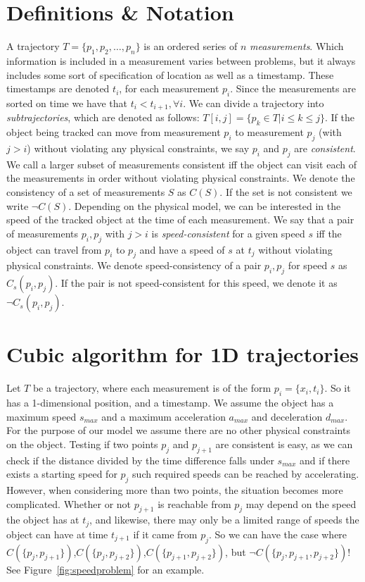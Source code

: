 \documentclass{article}
\begin{document}
\section{Definitions \& Notation}
A trajectory \(T=\{p_1,p_2,\dots,p_n\}\) is an ordered series of \(n\) \emph{measurements}. Which information is included in a measurement varies between problems, but it always includes some sort of specification of location as well as a timestamp. These timestamps are denoted \(t_i\), for each measurement \(p_i\). Since the measurements are sorted on time we have that \(t_i < t_{i+1},  \forall i\). We can divide a trajectory into \emph{subtrajectories}, which are denoted as follows: \(T[i,j]=\{p_k \in T | i \leq k \leq j\}\).
If the object being tracked can move from measurement \(p_i\) to measurement \(p_j\) (with \(j>i\)) without violating any physical constraints, we say \(p_i\) and \(p_j\) are \emph{consistent}. We call a larger subset of measurements consistent iff the object can visit each of the measurements in order without violating physical constraints. 
We denote the consistency of a set of measurements \(S\) as \(C(S)\). If the set is not consistent we write \(\neg C(S)\).
Depending on the physical model, we can be interested in the speed of the tracked object at the time of each measurement. We say that a pair of measurements \(p_i, p_j\) with \(j>i\) is \emph{speed-consistent} for a given speed \(s\) iff the object can travel from \(p_i\) to \(p_j\) and have a speed of \(s\) at \(t_j\) without violating physical constraints. We denote speed-consistency of a pair \(p_i, p_j\) for speed \(s\) as \(C_s(p_i,p_j)\). If the pair is not speed-consistent for this speed, we denote it as \(\neg C_s(p_i,p_j)\).

\section{Cubic algorithm for 1D trajectories}
\label{sec:1dspeedless}
Let \(T\) be a trajectory, where each measurement is of the form \(p_i=\{x_i,t_i\}\). So it has a 1-dimensional position, and a timestamp. We assume the object has a maximum speed \(s_{max}\) and a maximum acceleration \(a_{max}\) and deceleration \(d_{max}\). For the purpose of our model we assume there are no other physical constraints on the object.
Testing if two points \(p_j\) and \(p_{j+1}\) are consistent is easy, as we can check if the distance divided by the time difference falls under \(s_{max}\) and if there exists a starting speed for \(p_j\) such  required speeds can be reached by accelerating. However, when considering more than two points, the situation becomes more complicated. Whether or not \(p_{j+1}\) is reachable from \(p_j\) may depend on the speed the object has at \(t_j\), and likewise, there may only be a limited range of speeds the object can have at time \(t_{j+1}\) if it came from \(p_j\). So we can have the case where \(C(\{p_j,p_{j+1}\})\),\(C(\{p_j,p_{j+2}\})\),\(C(\{p_{j+1},p_{j+2}\})\), but \(\neg C(\{p_j,p_{j+1},p_{j+2}\})\)! See Figure~\ref{fig:speedproblem} for an example.
\end{document}

